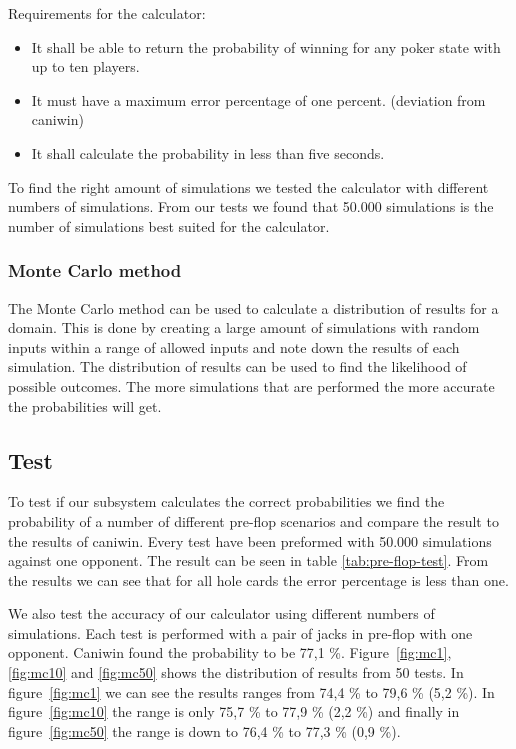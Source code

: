 Requirements for the calculator:
\begin{itemize}
\item It shall be able to return the probability of winning for any poker state with up to ten players.
\item It must have a maximum error percentage of one percent. (deviation from caniwin)
\item It shall calculate the probability in less than five seconds.
\end{itemize}

To find the right amount of simulations we tested the calculator with different numbers of simulations. From our tests we found that 50.000 simulations is the number of simulations best suited for the calculator.

\subsubsection{Monte Carlo method}
The Monte Carlo method can be used to calculate a distribution of results for a domain. This is done by creating a large amount of simulations with random inputs within a range of allowed inputs and note down the results of each simulation. The distribution of results can be used to find the likelihood of possible outcomes. The more simulations that are performed the more accurate the probabilities will get.

\subsection{Test}
To test if our subsystem calculates the correct probabilities we find the probability of a number of different pre-flop scenarios and compare the result to the results of caniwin. Every test have been preformed with 50.000 simulations against one opponent. The result can be seen in table \ref{tab:pre-flop-test}. From the results we can see that for all hole cards the error percentage is less than one.

We also test the accuracy of our calculator using different numbers of simulations. Each test is performed with a pair of jacks in pre-flop with one opponent. Caniwin found the probability to be 77,1 \%. Figure~\ref{fig:mc1}, \ref{fig:mc10} and \ref{fig:mc50} shows the distribution of results from 50 tests. In figure~\ref{fig:mc1} we can see the results ranges from 74,4 \% to 79,6 \% (5,2 \%). In figure~\ref{fig:mc10} the range is only 75,7 \% to 77,9 \% (2,2 \%) and finally in figure~\ref{fig:mc50} the range is down to 76,4 \% to 77,3 \% (0,9 \%).

